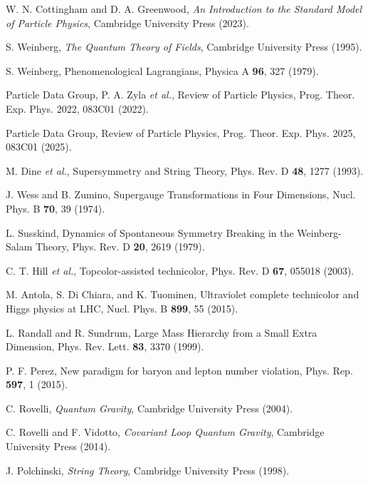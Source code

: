 \documentclass[%
amsmath,amssymb,
aps,
prb,
floatfix,
twocolumn
]{revtex4-2}
\begin{document}
\begin{thebibliography}{99}

W. N. Cottingham and D. A. Greenwood, 
\textit{An Introduction to the Standard Model of Particle Physics}, 
Cambridge University Press (2023).

S. Weinberg, 
\textit{The Quantum Theory of Fields}, 
Cambridge University Press (1995).

S. Weinberg, 
Phenomenological Lagrangians, 
Physica A \textbf{96}, 327 (1979).

Particle Data Group, P. A. Zyla \textit{et al.}, 
Review of Particle Physics, 
Prog. Theor. Exp. Phys. 2022, 083C01 (2022).

Particle Data Group, 
Review of Particle Physics, 
Prog. Theor. Exp. Phys. 2025, 083C01 (2025).

M. Dine \textit{et al.}, 
Supersymmetry and String Theory, 
Phys. Rev. D \textbf{48}, 1277 (1993).

J. Wess and B. Zumino, 
Supergauge Transformations in Four Dimensions, 
Nucl. Phys. B \textbf{70}, 39 (1974).

L. Susskind, 
Dynamics of Spontaneous Symmetry Breaking in the Weinberg-Salam Theory, 
Phys. Rev. D \textbf{20}, 2619 (1979).

C. T. Hill \textit{et al.}, 
Topcolor-assisted technicolor, 
Phys. Rev. D \textbf{67}, 055018 (2003).

M. Antola, S. Di Chiara, and K. Tuominen, 
Ultraviolet complete technicolor and Higgs physics at LHC, 
Nucl. Phys. B \textbf{899}, 55 (2015).

L. Randall and R. Sundrum, 
Large Mass Hierarchy from a Small Extra Dimension, 
Phys. Rev. Lett. \textbf{83}, 3370 (1999).

P. F. Perez, 
New paradigm for baryon and lepton number violation, 
Phys. Rep. \textbf{597}, 1 (2015).

C. Rovelli, 
\textit{Quantum Gravity}, 
Cambridge University Press (2004).

C. Rovelli and F. Vidotto, 
\textit{Covariant Loop Quantum Gravity}, 
Cambridge University Press (2014).

J. Polchinski, 
\textit{String Theory}, 
Cambridge University Press (1998).


\end{thebibliography}
\end{document}
